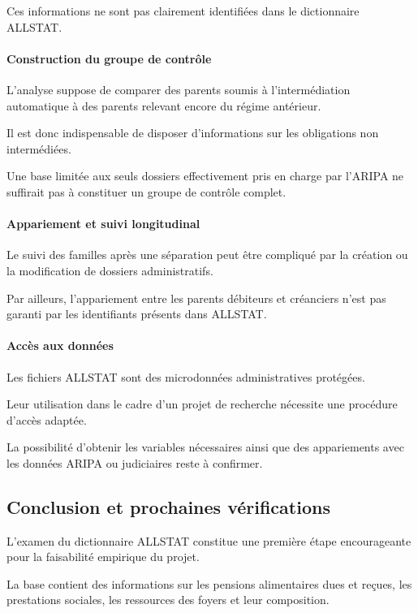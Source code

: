 \documentclass[11pt,a4paper]{article}
\begin{document}
Ces informations ne
sont pas clairement
identifiées dans
le dictionnaire ALLSTAT.

\paragraph{Construction du groupe de contrôle}

L'analyse suppose
de comparer des parents
soumis à l'intermédiation
automatique à des parents
relevant encore
du régime antérieur.

Il est donc indispensable
de disposer d'informations
sur les obligations
non intermédiées.

Une base limitée
aux seuls dossiers
effectivement pris
en charge par l'ARIPA
ne suffirait pas
à constituer un groupe
de contrôle complet.

\paragraph{Appariement et suivi longitudinal}

Le suivi des familles
après une séparation
peut être compliqué
par la création ou
la modification de
dossiers administratifs.

Par ailleurs,
l'appariement entre
les parents débiteurs
et créanciers
n'est pas garanti
par les identifiants
présents dans ALLSTAT.

\paragraph{Accès aux données}

Les fichiers ALLSTAT
sont des microdonnées
administratives protégées.

Leur utilisation
dans le cadre
d'un projet de recherche
nécessite une procédure
d'accès adaptée.

La possibilité
d'obtenir les variables
nécessaires ainsi que
des appariements
avec les données ARIPA
ou judiciaires reste
à confirmer.

\subsection{Conclusion et prochaines vérifications}

L'examen du dictionnaire
ALLSTAT constitue
une première étape
encourageante pour
la faisabilité empirique
du projet.

La base contient
des informations
sur les pensions
alimentaires dues
et reçues,
les prestations sociales,
les ressources des foyers
et leur composition.
\end{document}
